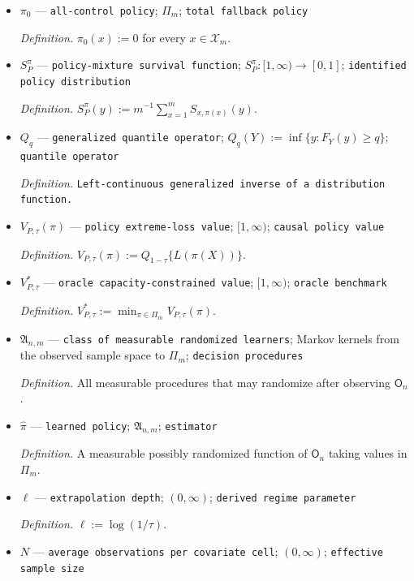 \documentclass{article}
\begin{document}
\begin{itemize}
  \item \(\pi_0\) --- \texttt{all-\allowbreak{}control policy}; \(\Pi_m\); \texttt{total fallback policy}
  \par\smallskip\noindent\emph{Definition.} \(\pi_0(x):=0\) for every \(x\in\mathcal X_m\).
  \item \(S_P^{\pi}\) --- \texttt{policy-\allowbreak{}mixture survival function}; \(S_P^{\pi}:[1,\infty)\to[0,1]\); \texttt{identified policy distribution}
  \par\smallskip\noindent\emph{Definition.} \(S_P^{\pi}(y):=m^{-1}\sum_{x=1}^m S_{x,\pi(x)}(y)\).
  \item \(Q_q\) --- \texttt{generalized quantile operator}; \(Q_q(Y):=\inf\{y:F_Y(y)\ge q\}\); \texttt{quantile operator}
  \par\smallskip\noindent\emph{Definition.} \texttt{Left-\allowbreak{}continuous generalized inverse of a distribution function.}
  \item \(V_{P,\tau}(\pi)\) --- \texttt{policy extreme-\allowbreak{}loss value}; \([1,\infty)\); \texttt{causal policy value}
  \par\smallskip\noindent\emph{Definition.} \(V_{P,\tau}(\pi):=Q_{1-\tau}\{L(\pi(X))\}\).
  \item \(V^*_{P,\tau}\) --- \texttt{oracle capacity-\allowbreak{}constrained value}; \([1,\infty)\); \texttt{oracle benchmark}
  \par\smallskip\noindent\emph{Definition.} \(V^*_{P,\tau}:=\min_{\pi\in\Pi_m}V_{P,\tau}(\pi)\).
  \item \(\mathfrak A_{n,m}\) --- \texttt{class of measurable randomized learners}; Markov kernels from the observed sample space to \(\Pi_m\); \texttt{decision procedures}
  \par\smallskip\noindent\emph{Definition.} All measurable procedures that may randomize after observing \(\mathsf O_n\).
  \item \(\widehat\pi\) --- \texttt{learned policy}; \(\mathfrak A_{n,m}\); \texttt{estimator}
  \par\smallskip\noindent\emph{Definition.} A measurable possibly randomized function of \(\mathsf O_n\) taking values in \(\Pi_m\).
  \item \(\ell\) --- \texttt{extrapolation depth}; \((0,\infty)\); \texttt{derived regime parameter}
  \par\smallskip\noindent\emph{Definition.} \(\ell:=\log(1/\tau)\).
  \item \(N\) --- \texttt{average observations per covariate cell}; \((0,\infty)\); \texttt{effective sample size}

\end{itemize}
\end{document}
